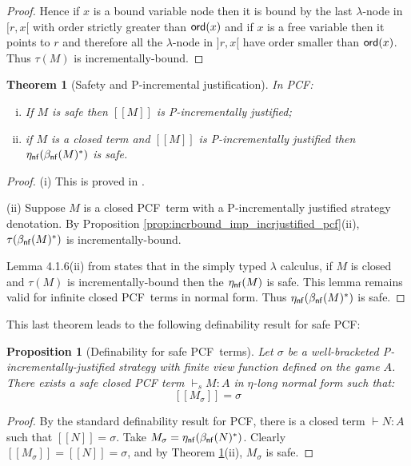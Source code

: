 \documentclass{article}
\newcommand{\sem}[1]{{[\![ #1 ]\!]}}
\newcommand\pcf{\textsf{PCF}}
\def\etanf#1{\eta_{\sf nf}(#1)}
\def\betanf#1{\beta_{\sf nf}(#1)}
\newcommand{\ord}[1]{{\sf ord}(#1)}
\newtheorem{theorem}{Theorem}[section]
\newtheorem{proposition}{Proposition}[section]
\theoremstyle{remark}
\theoremstyle{definition}
\begin{document}
\begin{proof}
Hence if $x$ is a bound variable node then it is bound by the
last $\lambda$-node in $[r,x[$ with order strictly greater than
$\ord{x}$ and if $x$ is a free variable then it points to $r$ and
therefore all the $\lambda$-node in $]r,x[$ have order smaller than
$\ord{x}$. Thus $\tau(M)$ is incrementally-bound.

\end{proof}

\begin{theorem}[Safety and P-incremental justification]
\label{thm:safeincrejust_pcf} In \pcf:
\begin{enumerate}[(i)]
\item If $M$ is safe then $\sem{M}$ is P-incrementally justified;
\item if $M$ is a closed term and $\sem{M}$ is
  P-incrementally justified then $\etanf{\betanf{M}^*}$ is safe.
\end{enumerate}
\end{theorem}
\begin{proof}
\noindent(i)
This is proved in  \cite[Theorem 4.2.10]{blumtransfer}.

\noindent(ii) Suppose $M$ is a closed \pcf\ term with a P-incrementally justified strategy denotation. By Proposition \ref{prop:incrbound_imp_incrjustified_pcf}(ii), $\tau(\betanf{M}^*)$ is incrementally-bound.

Lemma 4.1.6(ii) from \cite{blumtransfer} states that in the simply typed $\lambda$ calculus, if $M$ is closed and $\tau(M)$ is incrementally-bound then the $\etanf{M}$ is safe.
This lemma remains valid for infinite closed \pcf\ terms in normal form.
Thus $\etanf{\betanf{M}^*}$ is safe.
\end{proof}

This last theorem leads to the following definability result for safe \pcf:
\begin{proposition}[Definability for safe \pcf\ terms]
\label{prop:safetydefinability}
Let $\sigma$ be a well-bracketed P-incrementally-justified strategy with finite view function defined on the game $A$. There exists a \emph{safe} closed PCF term $\vdash_s M : A$ in $\eta$-long normal form such that:
$$ \sem{M_\sigma} = \sigma $$
\end{proposition}
\begin{proof}
By the standard definability result for PCF, there is a closed term $\vdash N : A$ such that $\sem{N} = \sigma$.
Take $M_\sigma = \etanf{\betanf{N}^*}$.
Clearly $\sem{ M_\sigma} = \sem{N} = \sigma$, and by Theorem \ref{thm:safeincrejust_pcf}(ii), $M_\sigma$ is safe.
\end{proof}
\end{document}
